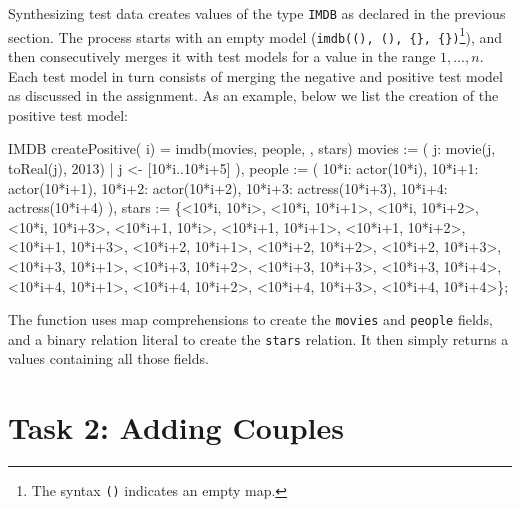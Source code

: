 \documentclass[submission,copyright,creativecommons]{eptcs}
\begin{document}
Synthesizing test data creates values of the type \texttt{IMDB} as declared in the previous section. The process starts with an empty model (\texttt{imdb((), (), \{\}, \{\})}\footnote{The syntax \texttt{()} indicates an empty map.}), and then consecutively merges it with test models for a value in the range $1,...,n$.
Each test model in turn consists of merging the negative and positive test model as discussed in the assignment. 
As an example, below we list the creation of the positive test model:
\begin{rascal}
IMDB createPositive( i) = imdb(movies, people, {}, stars)
     movies := ( j: movie(j, toReal(j), 2013) | j \textless{}- {}[10*i..10*i+5] ),
         people := ( 10*i: actor(10*i), 10*i+1: actor(10*i+1), 
                     10*i+2: actor(10*i+2), 10*i+3: actress(10*i+3), 
                     10*i+4: actress(10*i+4) ),
         stars := \{{}\textless{}10*i, 10*i\textgreater{}, \textless{}10*i, 10*i+1\textgreater{}, \textless{}10*i, 10*i+2\textgreater{}, \textless{}10*i, 10*i+3\textgreater{},
                 \textless{}10*i+1, 10*i\textgreater{}, \textless{}10*i+1, 10*i+1\textgreater{}, \textless{}10*i+1, 10*i+2\textgreater{}, \textless{}10*i+1, 10*i+3\textgreater{},
                 \textless{}10*i+2, 10*i+1\textgreater{}, \textless{}10*i+2, 10*i+2\textgreater{}, \textless{}10*i+2, 10*i+3\textgreater{},
                 \textless{}10*i+3, 10*i+1\textgreater{}, \textless{}10*i+3, 10*i+2\textgreater{}, \textless{}10*i+3, 10*i+3\textgreater{}, \textless{}10*i+3, 10*i+4\textgreater{},
                 \textless{}10*i+4, 10*i+1\textgreater{}, \textless{}10*i+4, 10*i+2\textgreater{}, \textless{}10*i+4, 10*i+3\textgreater{}, \textless{}10*i+4, 10*i+4\textgreater{}\}{};          
\end{rascal}

The function uses map comprehensions to create the \texttt{movies} and \texttt{people} fields, and a binary relation literal to create the \texttt{stars} relation. It then simply returns a values containing all those fields.



\section{Task 2: Adding Couples}
\end{document}
